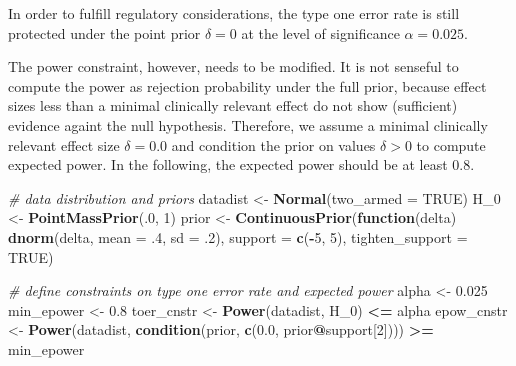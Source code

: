 \documentclass[
]{book}
\newenvironment{Shaded}{\begin{snugshade}}{\end{snugshade}}
\newcommand{\CommentTok}[1]{\textcolor[rgb]{0.56,0.35,0.01}{\textit{#1}}}
\newcommand{\ControlFlowTok}[1]{\textcolor[rgb]{0.13,0.29,0.53}{\textbf{#1}}}
\newcommand{\DataTypeTok}[1]{\textcolor[rgb]{0.13,0.29,0.53}{#1}}
\newcommand{\DecValTok}[1]{\textcolor[rgb]{0.00,0.00,0.81}{#1}}
\newcommand{\FloatTok}[1]{\textcolor[rgb]{0.00,0.00,0.81}{#1}}
\newcommand{\KeywordTok}[1]{\textcolor[rgb]{0.13,0.29,0.53}{\textbf{#1}}}
\newcommand{\NormalTok}[1]{#1}
\newcommand{\OperatorTok}[1]{\textcolor[rgb]{0.81,0.36,0.00}{\textbf{#1}}}
\newcommand{\OtherTok}[1]{\textcolor[rgb]{0.56,0.35,0.01}{#1}}
\newcommand{\StringTok}[1]{\textcolor[rgb]{0.31,0.60,0.02}{#1}}
\begin{document}
In order to fulfill regulatory considerations, the type one error rate
is still protected under the point prior \(\delta = 0\) at the level
of significance \(\alpha = 0.025\).

The power constraint, however, needs to be modified.
It is not senseful to compute the power as rejection probability under
the full prior, because effect sizes less than a minimal clinically relevant
effect do not show (sufficient) evidence againt the null hypothesis.
Therefore, we assume a minimal clinically relevant effect size
\(\delta = 0.0\) and condition the prior on values \(\delta > 0\)
to compute expected power.
In the following, the expected power should be at least \(0.8\).

\begin{Shaded}
\begin{Highlighting}[]
\CommentTok{\# data distribution and priors}
\NormalTok{datadist   \textless{}{-}}\StringTok{ }\KeywordTok{Normal}\NormalTok{(}\DataTypeTok{two\_armed =} \OtherTok{TRUE}\NormalTok{)}
\NormalTok{H\_}\DecValTok{0}\NormalTok{        \textless{}{-}}\StringTok{ }\KeywordTok{PointMassPrior}\NormalTok{(.}\DecValTok{0}\NormalTok{, }\DecValTok{1}\NormalTok{)}
\NormalTok{prior      \textless{}{-}}\StringTok{ }\KeywordTok{ContinuousPrior}\NormalTok{(}\ControlFlowTok{function}\NormalTok{(delta) }\KeywordTok{dnorm}\NormalTok{(delta, }\DataTypeTok{mean =} \FloatTok{.4}\NormalTok{, }\DataTypeTok{sd =} \FloatTok{.2}\NormalTok{),}
                              \DataTypeTok{support =} \KeywordTok{c}\NormalTok{(}\OperatorTok{{-}}\DecValTok{5}\NormalTok{, }\DecValTok{5}\NormalTok{),}
                              \DataTypeTok{tighten\_support =} \OtherTok{TRUE}\NormalTok{)}

\CommentTok{\# define constraints on type one error rate and expected power}
\NormalTok{alpha      \textless{}{-}}\StringTok{ }\FloatTok{0.025}
\NormalTok{min\_epower \textless{}{-}}\StringTok{ }\FloatTok{0.8}
\NormalTok{toer\_cnstr \textless{}{-}}\StringTok{ }\KeywordTok{Power}\NormalTok{(datadist, H\_}\DecValTok{0}\NormalTok{) }\OperatorTok{\textless{}=}\StringTok{ }\NormalTok{alpha}
\NormalTok{epow\_cnstr \textless{}{-}}\StringTok{ }\KeywordTok{Power}\NormalTok{(datadist, }\KeywordTok{condition}\NormalTok{(prior, }\KeywordTok{c}\NormalTok{(}\FloatTok{0.0}\NormalTok{, prior}\OperatorTok{@}\NormalTok{support[}\DecValTok{2}\NormalTok{]))) }\OperatorTok{\textgreater{}=}\StringTok{ }\NormalTok{min\_epower}
\end{Highlighting}
\end{Shaded}
\end{document}
